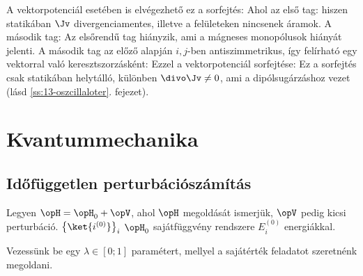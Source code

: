    A vektorpotenciál esetében is elvégezhető ez a sorfejtés: 
   Ahol az első tag:
   hiszen statikában $\Jv$ divergenciamentes, illetve a felületeken nincsenek áramok.
   A második tag:
   Az elsőrendű tag hiányzik, ami a mágneses monopólusok hiányát jelenti.
   A második tag az előző alapján $i,j$-ben antiszimmetrikus, így felírható egy vektorral való keresztszorzásként:
   Ezzel a vektorpotenciál sorfejtése:
   Ez a sorfejtés csak statikában helytálló, különben $\divo \Jv \ne 0$, ami a dipólsugárzáshoz vezet (lásd \ref{ss:13-oszcillaloter}. fejezet). 
   
 \section{Kvantummechanika}
  
  \subsection{Időfüggetlen perturbációszámítás}
   
   Legyen $\opH=\opH_0+\opV$, ahol $\opH$ megoldását ismerjük, $\opV$ pedig kicsi perturbáció. $\big\{\ket{i^{(0)}}\big\}_{i}$ $\opH_0$ sajátfüggvény rendszere $E_i^{(0)}$ energiákkal.
   
   Vezessünk be egy $\lambda\in[0;1]$ paramétert, mellyel a 
   sajátérték feladatot szeretnénk megoldani.
   
